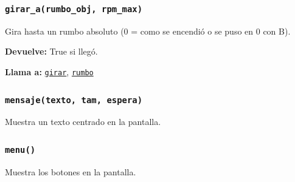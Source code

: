 \subsubsection{\texttt{girar\_\allowbreak{}a(rumbo\_\allowbreak{}obj, rpm\_\allowbreak{}max)}}\label{fn:funciones_rover:girar-a}
\noindent Gira hasta un rumbo absoluto (0 = como se encendió o se puso en 0 con B).

\par{}\par\smallskip
\noindent\textbf{Devuelve:} True si llegó.\par
\noindent\textbf{Llama a:} \hyperref[fn:funciones_rover:girar]{\texttt{girar}}, \hyperref[fn:funciones_rover:rumbo]{\texttt{rumbo}}\par

\subsubsection{\texttt{mensaje(texto, tam, espera)}}\label{fn:funciones_rover:mensaje}
\noindent Muestra un texto centrado en la pantalla.

\par{}\par\smallskip

\subsubsection{\texttt{menu()}}\label{fn:funciones_rover:menu}
\noindent Muestra los botones en la pantalla.


